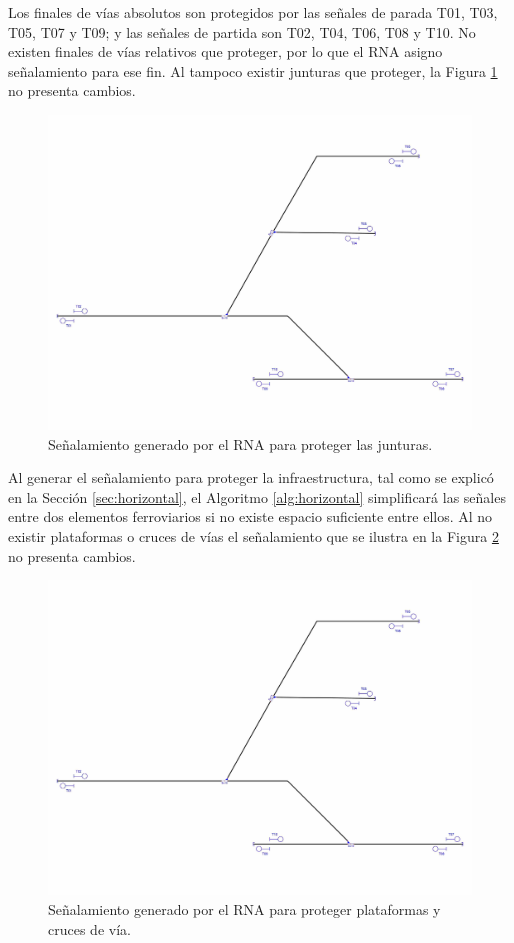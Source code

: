 	Los finales de vías absolutos son protegidos por las señales de parada T01, T03, T05, T07 y T09; y las señales de partida son T02, T04, T06, T08 y T10. No existen finales de vías relativos que proteger, por lo que el RNA asigno señalamiento para ese fin. Al tampoco existir junturas que proteger, la Figura \ref{fig:EJ7_4} no presenta cambios.
	
	\begin{figure}[H]
		\centering
		\includegraphics[width=1\textwidth]{resultados-obtenidos/ejemplo7/images/7_step2.png}
		\centering\caption{Señalamiento generado por el RNA para proteger las junturas.}
		\label{fig:EJ7_4}
	\end{figure}
	
	Al generar el señalamiento para proteger la infraestructura, tal como se explicó en la Sección \ref{sec:horizontal}, el Algoritmo \ref{alg:horizontal} simplificará las señales entre dos elementos ferroviarios si no existe espacio suficiente entre ellos. Al no existir plataformas o cruces de vías el señalamiento que se ilustra en la Figura \ref{fig:EJ7_5} no presenta cambios.
	
	\begin{figure}[H]
		\centering
		\includegraphics[width=1\textwidth]{resultados-obtenidos/ejemplo7/images/7_step3.png}
		\centering\caption{Señalamiento generado por el RNA para proteger plataformas y cruces de vía.}
		\label{fig:EJ7_5}
	\end{figure}
	
